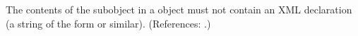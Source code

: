 The contents of the \Message subobject in a \Constraint object must not
contain an XML declaration (\ie a string of the form  or similar).  (References: .)
